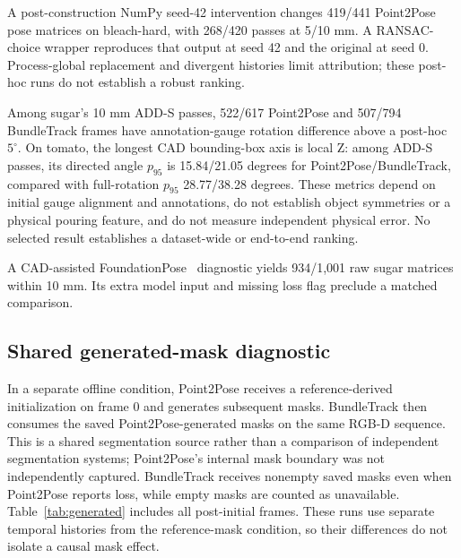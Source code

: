 \documentclass[10pt,journal]{IEEEtran}
\begin{document}
A post-construction NumPy seed-42 intervention changes 419/441 Point2Pose pose matrices on bleach-hard, with 268/420 passes at 5/10 mm. A RANSAC-choice wrapper reproduces that output at seed 42 and the original at seed 0. Process-global replacement and divergent histories limit attribution; these post-hoc runs do not establish a robust ranking.

Among sugar's 10 mm ADD-S passes, 522/617 Point2Pose and 507/794 BundleTrack frames have annotation-gauge rotation difference above a post-hoc $5^\circ$. On tomato, the longest CAD bounding-box axis is local Z: among ADD-S passes, its directed angle $p_{95}$ is 15.84/21.05 degrees for Point2Pose/BundleTrack, compared with full-rotation $p_{95}$ 28.77/38.28 degrees. These metrics depend on initial gauge alignment and annotations, do not establish object symmetries or a physical pouring feature, and do not measure independent physical error. No selected result establishes a dataset-wide or end-to-end ranking.

\begin{table}[t]
\centering
\caption{Selected reference-mask development runs. $n$ is the post-initial denominator; P2P and BT are Point2Pose and BundleTrack. Counts include unavailable frames as failures; AUC is normalized over 0--100 mm. The 10 mm threshold is post-hoc. *Bleach-hard was selected subsequently and its sorted-file reference association is unverified.}
\label{tab:pose}

\end{table}

A CAD-assisted FoundationPose~\cite{foundationpose} diagnostic yields 934/1,001 raw sugar matrices within 10 mm. Its extra model input and missing loss flag preclude a matched comparison.

\subsection{Shared generated-mask diagnostic}
In a separate offline condition, Point2Pose receives a reference-derived initialization on frame 0 and generates subsequent masks. BundleTrack then consumes the saved Point2Pose-generated masks on the same RGB-D sequence. This is a shared segmentation source rather than a comparison of independent segmentation systems; Point2Pose's internal mask boundary was not independently captured. BundleTrack receives nonempty saved masks even when Point2Pose reports loss, while empty masks are counted as unavailable. Table~\ref{tab:generated} includes all post-initial frames. These runs use separate temporal histories from the reference-mask condition, so their differences do not isolate a causal mask effect.
\end{document}
